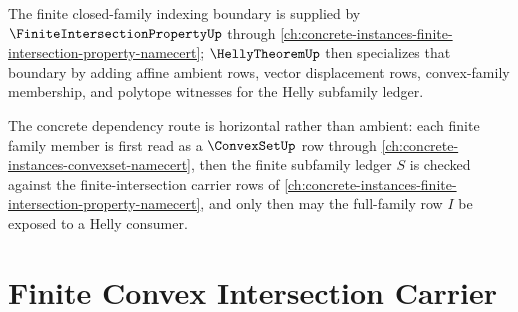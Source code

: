 The finite closed-family indexing boundary is supplied by $\FiniteIntersectionPropertyUp$ through \autoref{ch:concrete-instances-finite-intersection-property-namecert}; $\HellyTheoremUp$ then specializes that boundary by adding affine ambient rows, vector displacement rows, convex-family membership, and polytope witnesses for the Helly subfamily ledger.

The concrete dependency route is horizontal rather than ambient: each finite family member is first read as a $\ConvexSetUp$ row through \autoref{ch:concrete-instances-convexset-namecert}, then the finite subfamily ledger $S$ is checked against the finite-intersection carrier rows of \autoref{ch:concrete-instances-finite-intersection-property-namecert}, and only then may the full-family row $I$ be exposed to a Helly consumer.

\section{Finite Convex Intersection Carrier}
\label{sec:helly-theorem-carrier}

